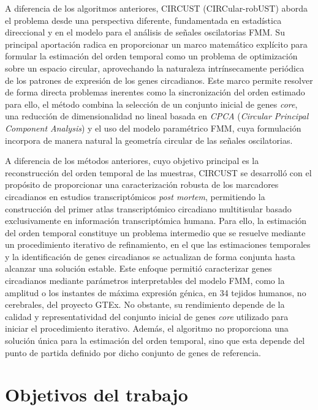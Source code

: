 \documentclass[12pt, a4paper]{report}
\begin{document}
A diferencia de los algoritmos anteriores, CIRCUST (CIRCular-robUST) aborda el problema desde una perspectiva diferente, fundamentada en estadística direccional y en el modelo para el análisis de señales oscilatorias FMM. Su principal aportación radica en proporcionar un marco matemático explícito para formular la estimación del orden temporal como un problema de optimización sobre un espacio circular, aprovechando la naturaleza intrínsecamente periódica de los patrones de expresión de los genes circadianos. Este marco permite resolver de forma directa problemas inerentes como la sincronización del orden estimado para ello, el método combina la selección de un conjunto inicial de genes \textit{core}, una reducción de dimensionalidad no lineal basada en \textit{CPCA} (\textit{Circular Principal Component Analysis}) \citep{CPCAKirby, scholz2007} y el uso del modelo paramétrico FMM, cuya formulación incorpora de manera natural la geometría circular de las señales oscilatorias.

A diferencia de los métodos anteriores, cuyo objetivo principal es la reconstrucción del orden temporal de las muestras, CIRCUST se desarrolló con el propósito de proporcionar una caracterización robusta de los marcadores circadianos en estudios transcriptómicos \textit{post mortem}, permitiendo la construcción del primer atlas transcriptómico circadiano multitisular basado exclusivamente en información transcriptómica humana. Para ello, la estimación del orden temporal constituye un problema intermedio que se resuelve mediante un procedimiento iterativo de refinamiento, en el que las estimaciones temporales y la identificación de genes circadianos se actualizan de forma conjunta hasta alcanzar una solución estable. Este enfoque permitió caracterizar genes circadianos mediante parámetros interpretables del modelo FMM, como la amplitud o los instantes de máxima expresión génica, en 34 tejidos humanos, no cerebrales, del proyecto GTEx. No obstante, su rendimiento depende de la calidad y representatividad del conjunto inicial de genes \textit{core} utilizado para iniciar el procedimiento iterativo. Además, el algoritmo no proporciona una solución única para la estimación del orden temporal, sino que esta depende del punto de partida definido por dicho conjunto de genes de referencia.

\section{Objetivos del trabajo}
\end{document}
